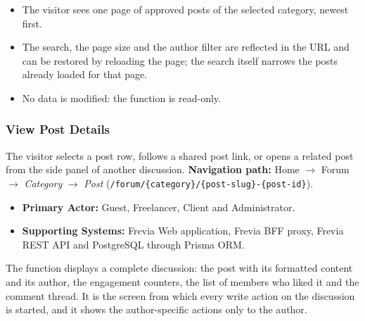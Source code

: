 \begin{itemize}[leftmargin=1.6em,topsep=3pt,itemsep=2pt,parsep=0pt,label=$\bullet$]
      \item The visitor sees one page of approved posts of the selected category, newest
            first.
      \item The search, the page size and the author filter are reflected in the URL and
            can be restored by reloading the page; the search itself narrows the posts
            already loaded for that page.
      \item No data is modified: the function is read-only.
\end{itemize}


\subsubsection{ View Post Details}

The visitor selects a post row, follows a shared post link, or opens a related post from the
side panel of another discussion.\newline
\textbf{Navigation path:} Home $\rightarrow$ Forum $\rightarrow$ \textit{Category} $\rightarrow$
\textit{Post} (\texttt{/\allowbreak{}forum/\allowbreak{}\{category\}/\allowbreak{}\{post-\allowbreak{}slug\}-\{post-\allowbreak{}id\}}).


\begin{itemize}[leftmargin=1.6em,topsep=3pt,itemsep=2pt,parsep=0pt,label=$\bullet$]
      \item \textbf{Primary Actor:} Guest, Freelancer, Client and Administrator.
      \item \textbf{Supporting Systems:} Frevia Web application, Frevia BFF proxy, Frevia REST API
            and PostgreSQL through Prisma ORM.
\end{itemize}

\noindent The function displays a complete discussion: the post with its formatted content and
its author, the engagement counters, the list of members who liked it and the comment thread.
It is the screen from which every write action on the discussion is started, and it shows the
author-specific actions only to the author.

